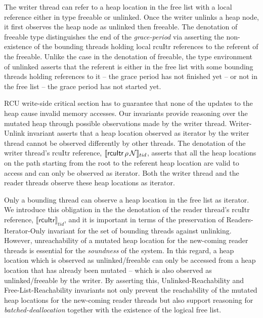The writer thread can refer to a heap location in the free list with a local reference either in type \textsf{freeable} or \textsf{unlinked}. Once the writer unlinks a heap node, it first observes the heap node as \textsf{unlinked} then \textsf{freeable}. The denotation of \textsf{freeable} type distinguishes the end of the \textit{grace-period} via asserting the non-existence of the bounding threads holding local \textsf{rcuItr} references to the referent of the \textsf{freeable}. Unlike the case in the denotation of \textsf{freeable}, the type environment of \textsf{unlinked} asserts that the referent is either in the free list with some bounding threads holding references to it -- the grace period has not finished yet -- or not in the free list -- the grace period has not started yet. 

 RCU write-side critical section has to guarantee that none of the updates to the heap cause invalid memory accesses. Our invariants provide reasoning over the mutated heap through possible observations made by the writer thread. \textsf{Writer-Unlink} invariant asserts that a heap location observed as \textsf{iterator} by the writer thread cannot be observed differently by other threads. The denotation of the writer thread's \textsf{rcuItr} reference, $\llbracket \mathsf{rcuItr}\,\rho \,\mathcal{N} \rrbracket_{tid}$, asserts that all the heap locations on the path starting from the root to the referent heap location are valid to access and can only be observed as \textsf{iterator}. Both the writer thread and the reader threads observe these heap locations as \textsf{iterator}.

Only a bounding thread can observe a heap location in the free list as \textsf{iterator}. We introduce this obligation in the the denotation of the reader thread's \textsf{rcuItr} reference, $\llbracket \mathsf{rcuItr} \rrbracket_{tid}$, and it is important in terms of  the preservation of \textsf{Readers-Iterator-Only} invariant for the set of bounding threads against unlinking. However, unreachability of a mutated heap location for the new-coming reader threads is essential for the \textit{soundness} of the system. In this regard, a heap location which is observed as \textsf{unlinked}/\textsf{freeable} can only be accessed from a heap location that has already been mutated -- which is also observed as \textsf{unlinked}/\textsf{freeable} by the writer. By asserting this, \textsf{Unlinked-Reachability} and \textsf{Free-List-Reachability} invariants not only prevent the reachability of the mutated heap locations for the new-coming reader threads but also support reasoning for \textit{batched-deallocation} together with the existence of the logical free list.
 
